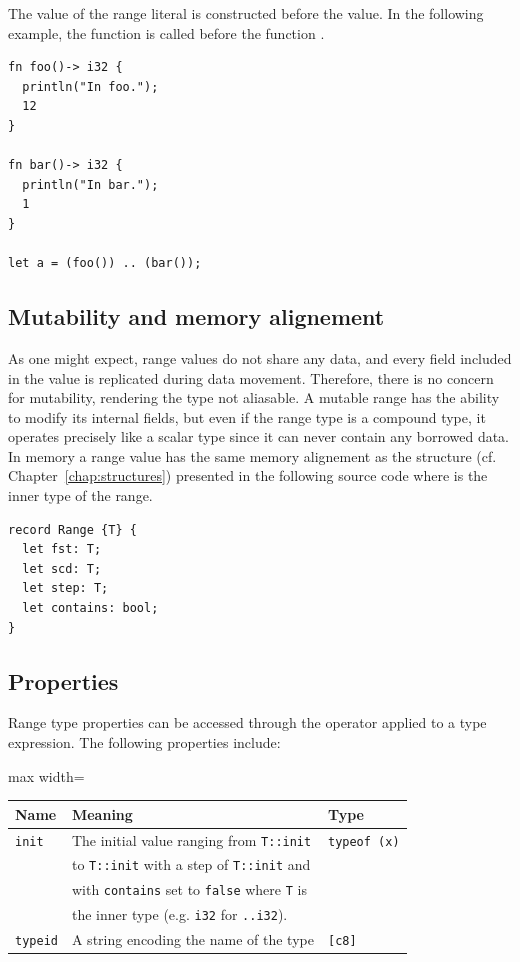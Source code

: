 The  value of the range literal is constructed before the
 value. In the following example, the function  is
called before the function .

\begin{lstlisting}[style=coloredverbatim]
fn foo()-> i32 {
  println("In foo.");
  12
}

fn bar()-> i32 {
  println("In bar.");
  1
}

let a = (foo()) .. (bar());
\end{lstlisting}

\subsection {Mutability and memory alignement}

As one might expect, range values do not share any data, and every field
included in the value is replicated during data movement. Therefore, there is no
concern for mutability, rendering the type not aliasable. A mutable range has
the ability to modify its internal fields, but even if the range type is a
compound type, it operates precisely like a scalar type since it can never
contain any borrowed data. In memory a range value has the same memory
alignement as the structure (cf. Chapter~\ref{chap:structures}) presented in the
following source code where  is the inner type of the range.

\begin{lstlisting}[style=coloredverbatim]
record Range {T} {
  let fst: T;
  let scd: T;
  let step: T;
  let contains: bool;
}
\end{lstlisting}

\subsection {Properties}

Range type properties can be accessed through the operator \token{::} applied
to a type expression. The following properties include:

\begin{center}\begin{adjustbox}{max width=\linewidth}
  \begin{tabular}{|l|ll|}
    \hline
    Name & Meaning & Type\\
    \hline
    \hline
    \texttt{init} & The initial value ranging from \texttt{T::init} & \texttt{typeof (x)}\\
    & to \texttt{T::init} with a step of \texttt{T::init} and & \\
    & with \texttt{contains} set to \texttt{false} where \texttt{T} is & \\
    & the inner type (e.g. \texttt{i32} for \texttt{..i32}). &\\
    \hline
    \texttt{typeid} & A string encoding the name of the type & \texttt{[c8]} \\
    \hline
  \end{tabular}
\end{adjustbox}\end{center}


